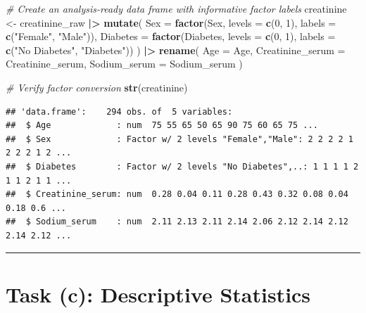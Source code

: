 \documentclass[
  12pt,
]{article}
\newenvironment{Shaded}{\begin{snugshade}}{\end{snugshade}}
\newcommand{\AttributeTok}[1]{\textcolor[rgb]{0.13,0.29,0.53}{#1}}
\newcommand{\CommentTok}[1]{\textcolor[rgb]{0.56,0.35,0.01}{\textit{#1}}}
\newcommand{\DecValTok}[1]{\textcolor[rgb]{0.00,0.00,0.81}{#1}}
\newcommand{\FunctionTok}[1]{\textcolor[rgb]{0.13,0.29,0.53}{\textbf{#1}}}
\newcommand{\NormalTok}[1]{#1}
\newcommand{\OtherTok}[1]{\textcolor[rgb]{0.56,0.35,0.01}{#1}}
\newcommand{\SpecialCharTok}[1]{\textcolor[rgb]{0.81,0.36,0.00}{\textbf{#1}}}
\newcommand{\StringTok}[1]{\textcolor[rgb]{0.31,0.60,0.02}{#1}}
\begin{document}
\begin{Shaded}
\begin{Highlighting}[]
\CommentTok{\# Create an analysis{-}ready data frame with informative factor labels}
\NormalTok{creatinine }\OtherTok{\textless{}{-}}\NormalTok{ creatinine\_raw }\SpecialCharTok{|\textgreater{}}
  \FunctionTok{mutate}\NormalTok{(}
    \AttributeTok{Sex      =} \FunctionTok{factor}\NormalTok{(Sex,      }\AttributeTok{levels =} \FunctionTok{c}\NormalTok{(}\DecValTok{0}\NormalTok{, }\DecValTok{1}\NormalTok{),}
                      \AttributeTok{labels =} \FunctionTok{c}\NormalTok{(}\StringTok{"Female"}\NormalTok{, }\StringTok{"Male"}\NormalTok{)),}
    \AttributeTok{Diabetes =} \FunctionTok{factor}\NormalTok{(Diabetes, }\AttributeTok{levels =} \FunctionTok{c}\NormalTok{(}\DecValTok{0}\NormalTok{, }\DecValTok{1}\NormalTok{),}
                      \AttributeTok{labels =} \FunctionTok{c}\NormalTok{(}\StringTok{"No Diabetes"}\NormalTok{, }\StringTok{"Diabetes"}\NormalTok{))}
\NormalTok{  ) }\SpecialCharTok{|\textgreater{}}
  \FunctionTok{rename}\NormalTok{(}
    \AttributeTok{Age               =}\NormalTok{ Age,}
    \AttributeTok{Creatinine\_serum  =}\NormalTok{ Creatinine\_serum,}
    \AttributeTok{Sodium\_serum      =}\NormalTok{ Sodium\_serum}
\NormalTok{  )}

\CommentTok{\# Verify factor conversion}
\FunctionTok{str}\NormalTok{(creatinine)}
\end{Highlighting}
\end{Shaded}

\begin{verbatim}
## 'data.frame':    294 obs. of  5 variables:
##  $ Age             : num  75 55 65 50 65 90 75 60 65 75 ...
##  $ Sex             : Factor w/ 2 levels "Female","Male": 2 2 2 2 1 2 2 2 1 2 ...
##  $ Diabetes        : Factor w/ 2 levels "No Diabetes",..: 1 1 1 1 2 1 1 2 1 1 ...
##  $ Creatinine_serum: num  0.28 0.04 0.11 0.28 0.43 0.32 0.08 0.04 0.18 0.6 ...
##  $ Sodium_serum    : num  2.11 2.13 2.11 2.14 2.06 2.12 2.14 2.12 2.14 2.12 ...
\end{verbatim}

\begin{center}\rule{0.5\linewidth}{0.5pt}\end{center}

\hypertarget{task-c-descriptive-statistics}{%
\section{Task (c): Descriptive
Statistics}\label{task-c-descriptive-statistics}}
\end{document}
